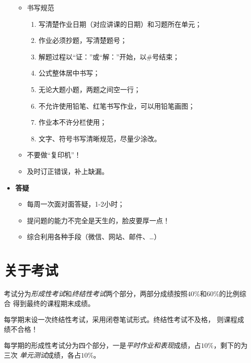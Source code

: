 \begin{itemize}
\begin{figure}[h]
\begin{center}
  		\label{fig:0.2}
  	\end{center}
  \end{figure}
  \begin{itemize}
    \item 书写规范
    \begin{enumerate}
      \item 写清楚作业日期（对应讲课的日期）和习题所在单元；
      \item 作业必须抄题，写清楚题号；
	  \item 解题过程以“证：”或“解：”开始，以$\#$号结束；
	  \item 公式整体居中书写；
	  \item 无论大题小题，两题之间空一行；
	  \item 不允许使用铅笔、红笔书写作业，可以用铅笔画图；
	  \item 作业本不许分栏使用；
	  \item 文字、符号书写清晰规范，尽量少涂改。
    \end{enumerate}    
    \item 不要做“复印机”！
    \item 及时订正错误，补上缺漏。
  \end{itemize}
	\item {\bf 答疑}
	  \begin{itemize}
	    \item 每周一次面对面答疑，1-2小时；
	    \item 提问题的能力不完全是天生的，脸皮要厚一点！
	    \item 综合利用各种手段（微信、网站、邮件、\ldots）
	  \end{itemize}
\end{itemize}

\section{关于考试}


考试分为{\it 形成性考试}和{\it 终结性考试}两个部分，两部分成绩按照$40\%$和$60\%$的比例综合
得到最终的课程期末成绩。

每学期末设一次终结性考试，采用闭卷笔试形式。{\baa 终结性考试不及格，
则课程成绩不合格！}

每学期的形成性考试分为四个部分，一是{\it 平时作业和表现}成绩，占$10\%$，剩下的为三次
{\it 单元测试}成绩，各占$10\%$。


